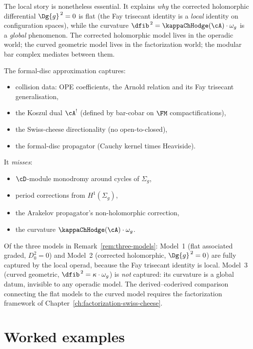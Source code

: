 The local story is nonetheless essential. It explains \emph{why}
the corrected holomorphic differential
$\Dg{g}^{\,2} = 0$ is flat (the Fay trisecant identity is a
\emph{local} identity on configuration spaces), while the curvature
$\dfib^{\,2} = \kappaChHodge(\cA) \cdot \omega_g$ is a \emph{global} phenomenon.
The corrected holomorphic model lives in the operadic world; the curved
geometric model lives in the factorization world; the modular bar
complex mediates between them.

\begin{remark}
\label{rem:local-model-range}
The formal-disc approximation captures:
\begin{itemize}
\item collision data: OPE coefficients, the Arnold relation and
 its Fay trisecant generalisation,
\item the Koszul dual $\cA^!$ (defined by bar-cobar on $\FM$
 compactifications),
\item the Swiss-cheese directionality (no open-to-closed),
\item the formal-disc propagator (Cauchy kernel times Heaviside).
\end{itemize}
It \emph{misses}:
\begin{itemize}
\item $\cD$-module monodromy around cycles of $\Sigma_g$,
\item period corrections from $H^1(\Sigma_g)$,
\item the Arakelov propagator's non-holomorphic correction,
\item the curvature $\kappaChHodge(\cA) \cdot \omega_g$.
\end{itemize}
Of the three models in Remark~\ref{rem:three-models}:
Model~1 (flat associated graded, $D_0^2 = 0$) and
Model~2 (corrected holomorphic, $\Dg{g}^{\,2} = 0$) are
fully captured by the local operad, because the Fay
trisecant identity is local. Model~3 (curved geometric,
$\dfib^{\,2} = \kappa \cdot \omega_g$) is \emph{not} captured:
its curvature is a global datum, invisible to any operadic
model. The derived--coderived comparison connecting the flat
models to the curved model requires the factorization
framework of Chapter~\ref{ch:factorization-swiss-cheese}.
\end{remark}


\section{Worked examples}
\label{sec:modular-sc-examples}

